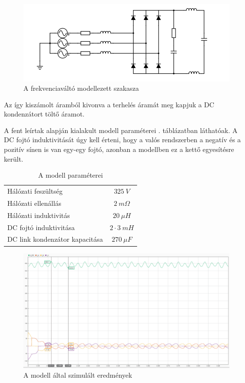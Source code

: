 
\begin{figure}[H!]
	\centering
	\includegraphics[width = \textwidth]{figures/VFD_virtual_RC.png}
	\caption{A frekvenciaváltó modellezett szakasza} 
	\label{fig:virtualRC}
\end{figure}

Az így kiszámolt áramból kivonva a terhelés áramát meg kapjuk a DC kondenzátort töltő áramot.

A fent leírtak alapján kialakult modell paraméterei . táblázatban láthatóak. A DC fojtó induktivitását úgy kell érteni, hogy a valós rendszerben a negatív és a pozitív sínen is van egy-egy fojtó, azonban a modellben ez a kettő egyesítésre került.

\begin{table}[H]
\centering
\begin{tabular}{lS}
Hálózati feszültség            & $325\ V$ 		\\
Hálózati ellenállás            & $2\ m\Omega$   \\
Hálózati induktivitás          & $20\ \mu{}H$    			\\
DC fojtó induktivitása         & $2 \cdot{} 3\ mH$    			\\
DC link kondenzátor kapacitása & $270\ \mu{}F $   
\end{tabular}
\caption{A modell paraméterei}
\label{parameters}
\end{table}

\begin{figure}[H]
	\centering
	\includegraphics[width = \textwidth]{figures/continous_testrun_1.png}
	\caption{A modell által szimulált eredmények} 
	\label{fig:cont_run}
\end{figure}

